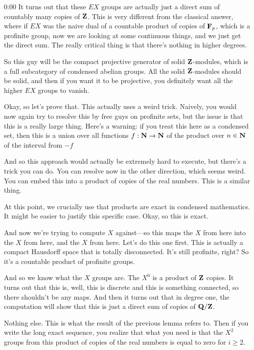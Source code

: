 \begin{unfinished}{0:00}
It turns out that these $EX$ groups are actually just a direct sum of countably many copies of $\mathbf Z$. This is very different from the classical answer, where if $EX$ was the naive dual of a countable product of copies of $\mathbf F_p$, which is a profinite group, now we are looking at some continuous things, and we just get the direct sum. The really critical thing is that there's nothing in higher degrees.

So this guy will be the compact projective generator of solid $\mathbf Z$-modules, which is a full subcategory of condensed abelian groups. All the solid $\mathbf Z$-modules should be solid, and then if you want it to be projective, you definitely want all the higher $EX$ groups to vanish.

Okay, so let's prove that. This actually uses a weird trick. Naively, you would now again try to resolve this by free guys on profinite sets, but the issue is that this is a really large thing. Here's a warning: if you treat this here as a condensed set, then this is a union over all functions $f: \mathbf N \to \mathbf N$ of the product over $n \in \mathbf N$ of the interval from $-f$

And so this approach would actually be extremely hard to execute, but there's a trick you can do. You can resolve now in the other direction, which seems weird. You can embed this into a product of copies of the real numbers. This is a similar thing.

At this point, we crucially use that products are exact in condensed mathematics. It might be easier to justify this specific case. Okay, so this is exact.

And now we're trying to compute $X$ against---so this maps the $X$ from here into the $X$ from here, and the $X$ from here. Let's do this one first. This is actually a compact Hausdorff space that is totally disconnected. It's still profinite, right? So it's a countable product of profinite groups.

And so we know what the $X$ groups are. The $X^0$ is a product of $\mathbf Z$ copies. It turns out that this is, well, this is discrete and this is something connected, so there shouldn't be any maps. And then it turns out that in degree one, the computation will show that this is just a direct sum of copies of $\mathbf Q/\mathbf Z$.

Nothing else. This is what the result of the previous lemma refers to. Then if you write the long exact sequence, you realize that what you need is that the $X^2$ groups from this product of copies of the real numbers is equal to zero for $i \geq 2$.


\end{unfinished}
